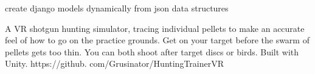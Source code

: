\documentclass[10pt,a4paper,ragged2e,withhyper]{altacv}
\begin{document}
\begin{paracol}{2}







\medskip

create django models dynamically from json data structures
\divider

    A VR shotgun hunting simulator, tracing individual pellets to make an accurate feel of how to go on the practice grounds.
 Get on your target before the swarm of pellets gets too thin.
 You can both shoot after target discs or birds.
 Built with Unity.
 https://github.
com/Grusinator/HuntingTrainerVR
      



\divider


\divider








\end{paracol}
\end{document}
